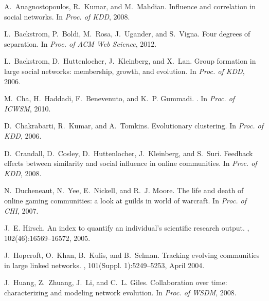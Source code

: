 \documentclass[letterpaper]{www13-companion-accepted}
\begin{document}

{

\begin{thebibliography}{10}

A.~Anagnostopoulos, R.~Kumar, and M.~Mahdian.
\newblock Influence and correlation in social networks.
\newblock In {\em Proc. of KDD}, 2008.

L.~Backstrom, P.~Boldi, M.~Rosa, J.~Ugander, and S.~Vigna.
\newblock Four degrees of separation.
\newblock In {\em Proc. of ACM Web Science}, 2012.

L.~Backstrom, D.~Huttenlocher, J.~Kleinberg, and X.~Lan.
\newblock Group formation in large social networks: membership, growth, and
  evolution.
\newblock In {\em Proc. of KDD}, 2006.

M.~Cha, H.~Haddadi, F.~Benevenuto, and K.~P. Gummadi.
.
\newblock In {\em Proc. of ICWSM}, 2010.

D.~Chakrabarti, R.~Kumar, and A.~Tomkins.
\newblock Evolutionary clustering.
\newblock In {\em Proc. of KDD}, 2006.

D.~Crandall, D.~Cosley, D.~Huttenlocher, J.~Kleinberg, and S.~Suri.
\newblock Feedback effects between similarity and social influence in online
  communities.
\newblock In {\em Proc. of KDD}, 2008.

N.~Ducheneaut, N.~Yee, E.~Nickell, and R.~J. Moore.
\newblock The life and death of online gaming communities: a look at guilds in
  world of warcraft.
\newblock In {\em Proc. of CHI}, 2007.

J.~E. Hirsch.
\newblock An index to quantify an individual's scientific research output.
,
  102(46):16569--16572, 2005.

J.~Hopcroft, O.~Khan, B.~Kulis, and B.~Selman.
\newblock Tracking evolving communities in large linked networks.
, 101(Suppl.
  1):5249--5253, April 2004.

J.~Huang, Z.~Zhuang, J.~Li, and C.~L. Giles.
\newblock Collaboration over time: characterizing and modeling network
  evolution.
\newblock In {\em Proc. of WSDM}, 2008.


\end{thebibliography}}
\end{document}
